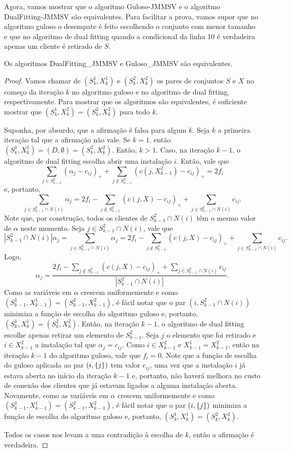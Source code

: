 Agora, vamos mostrar que o algoritmo {Guloso-JMMSV} e o algoritmo {\sc DualFitting-JMMSV} são equivalentes. Para facilitar a prova, vamos supor que no algoritmo guloso o desempate é feito escolhendo o conjunto com menor tamanho e que no algoritmo de dual fitting quando a condicional da linha 10 é verdadeira apenas um cliente é retirado de $S$.

\begin{theorem}
Os algoritmos {\sc DualFitting\_JMMSV} e {\sc Guloso\_JMMSV} são equivalentes.
\end{theorem}

\begin{proof}
Vamos chamar de $(S_k^1,X_k^1)$ e $(S_k^2,X_k^2)$ os pares de conjuntos $S$ e $X$ no começo da iteração $k$ no algoritmo guloso e no algoritmo de dual fitting, respectivamente. Para mostrar que os algoritmos são equivalentes, é suficiente mostrar que $(S_k^1,X_k^2) = (S_k^2,X_k^2)$ para todo $k$.

Suponha, por absurdo, que a afirmação é falsa para algum $k$. Seja $k$ a primeira iteração tal que a afirmação não vale. Se $k=1$, então $(S_k^1,X_k^1) = (D,\emptyset) = (S_k^2,X_k^2)$.
Então, $k>1$.
Caso, na iteração $k-1$, o algoritmo de dual fitting escolha abrir uma instalação $i$. Então, vale que 
\[
    \sum_{j \in S_{k-1}^2} (\alpha_j - c_{ij})_+ + \sum_{j \not \in S_{k-1}^2}(c(j,X_{k-1}^2) - c_{ij})_+ = 2f_i
\] 
e, portanto,
\[
    \sum_{j \in S_{k-1}^2 \cap N(i)} \alpha_j = 2f_i - \sum_{j \not \in S_{k-1}^2} (c(j,X)- c_{ij})_+  + \sum_{j \in  S_{k-1}^2 \cap N(i)} c_{ij}. 
\]
Note que, por construção, todos os clientes de  $S_{k-1}^2 \cap N(i)$ têm o mesmo valor de $\alpha$ neste momento. Seja $j \in S_{k-1}^2 \cap N(i)$, vale que
\[
    |S_{k-1}^2 \cap N(i)| \alpha_j = \sum_{j \in S_{k-1}^2 \cap N(i)} \alpha_j = 2f_i - \sum_{j \not \in S_{k-1}^2} (c(j,X)- c_{ij})_+  + \sum_{j \in  S_{k-1}^2 \cap N(i)} c_{ij}.
\]
Logo, 
\[
    \alpha_j = \frac{ 2f_i - \sum_{j \not \in S_{k-1}^2} (c(j,X)- c_{ij})_+  + \sum_{j \in  S_{k-1}^2 \cap N(i)} c_{ij}}{|S_{k-1}^2 \cap N(i)|}.
\]
Como as variáveis em $\alpha$ crescem uniformemente e como $(S_{k-1}^1,X_{k-1}^1) = (S_{k-1}^2,X_{k-1}^2)$, é fácil notar que o par $(i,S_{k-1}^2 \cap N(i))$ minimiza a função de escolha do algoritmo guloso e, portanto, $(S_{k}^1,X_{k}^1) = (S_{k}^2,X_{k}^2)$. Então, na iteração $k-1$, o algoritmo de dual fitting escolhe apenas retirar um elemento de $S_{k-1}^2$. Seja $j$ o elemento que foi retirado e $i \in X_{k-1}^2$ a instalação tal que $\alpha_j = c_{ij}$. Como $i \in X_{k-1}^2$ e $X_{k-1}^1 = X_{k-1}^2$, então na iteração $k-1$ do algoritmo guloso, vale que $f_i = 0$. Note que a função de escolha do guloso aplicada ao par $(i,\{j\})$ tem valor $c_{ij}$, uma vez que a instalação $i$ já estava aberta no início da iteração $k-1$ e, portanto, não haverá melhora no custo de conexão dos clientes que já estavam ligados a alguma instalação aberta. Novamente, como as variáveis em $\alpha$ crescem uniformemente e como $(S_{k-1}^1,X_{k-1}^1) = (S_{k-1}^2,X_{k-1}^2)$, é fácil notar que o par $(i,\{j\})$ minimiza a função de escolha do algoritmo guloso e, portanto, $(S_{k}^1,X_{k}^1) = (S_{k}^2,X_{k}^2)$.

Todos os casos nos levam a uma contradição à escolha de $k$, então a afirmação é verdadeira.   
\end{proof}